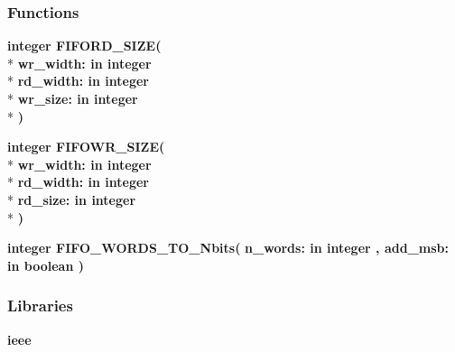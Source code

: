 \subsubsection*{Functions}
 \begin{DoxyCompactItemize}
\item 
{\bfseries {\bfseries \textcolor{comment}{integer}\textcolor{vhdlchar}{ }}} {\bf F\+I\+F\+O\+R\+D\+\_\+\+S\+I\+ZE}{\bfseries  ( }\\*
{\bfseries \textcolor{vhdlchar}{wr\+\_\+width\+: }\textcolor{stringliteral}{in }{\bfseries \textcolor{comment}{integer}\textcolor{vhdlchar}{ }}}\\*
{\bfseries \textcolor{vhdlchar}{rd\+\_\+width\+: }\textcolor{stringliteral}{in }{\bfseries \textcolor{comment}{integer}\textcolor{vhdlchar}{ }}}\\*
{\bfseries \textcolor{vhdlchar}{wr\+\_\+size\+: }\textcolor{stringliteral}{in }{\bfseries \textcolor{comment}{integer}\textcolor{vhdlchar}{ }}}\\*
{\bfseries  )} 
\item 
{\bfseries {\bfseries \textcolor{comment}{integer}\textcolor{vhdlchar}{ }}} {\bf F\+I\+F\+O\+W\+R\+\_\+\+S\+I\+ZE}{\bfseries  ( }\\*
{\bfseries \textcolor{vhdlchar}{wr\+\_\+width\+: }\textcolor{stringliteral}{in }{\bfseries \textcolor{comment}{integer}\textcolor{vhdlchar}{ }}}\\*
{\bfseries \textcolor{vhdlchar}{rd\+\_\+width\+: }\textcolor{stringliteral}{in }{\bfseries \textcolor{comment}{integer}\textcolor{vhdlchar}{ }}}\\*
{\bfseries \textcolor{vhdlchar}{rd\+\_\+size\+: }\textcolor{stringliteral}{in }{\bfseries \textcolor{comment}{integer}\textcolor{vhdlchar}{ }}}\\*
{\bfseries  )} 
\item 
{\bfseries {\bfseries \textcolor{comment}{integer}\textcolor{vhdlchar}{ }}} {\bf F\+I\+F\+O\+\_\+\+W\+O\+R\+D\+S\+\_\+\+T\+O\+\_\+\+Nbits}{\bfseries  ( }{\bfseries \textcolor{vhdlchar}{n\+\_\+words\+: }\textcolor{stringliteral}{in }{\bfseries \textcolor{comment}{integer}\textcolor{vhdlchar}{ }}}{\bfseries  , \textcolor{vhdlchar}{add\+\_\+msb\+: }\textcolor{stringliteral}{in }{\bfseries \textcolor{comment}{boolean}\textcolor{vhdlchar}{ }}}{\bfseries  )} 
\end{DoxyCompactItemize}
\subsubsection*{Libraries}
 \begin{DoxyCompactItemize}
\item 
{\bf ieee} 
\end{DoxyCompactItemize}
